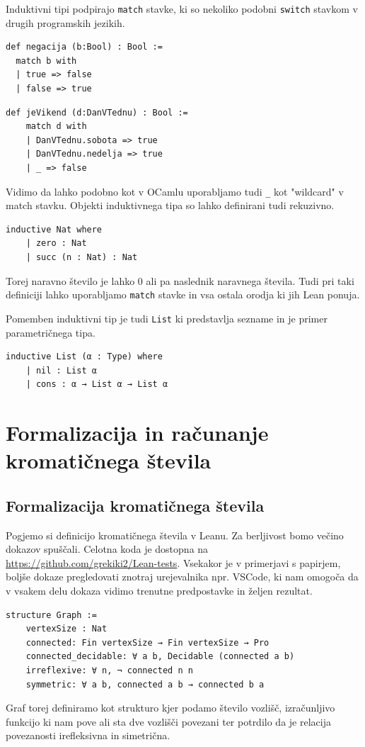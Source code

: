 \documentclass[mat1]{fmfdelo}
\begin{document}
Induktivni tipi podpirajo \lstinline{match} stavke, ki so nekoliko podobni \lstinline{switch} stavkom v drugih programskih jezikih.

\begin{lstlisting}
def negacija (b:Bool) : Bool :=
  match b with
  | true => false
  | false => true
\end{lstlisting}

\begin{lstlisting}
def jeVikend (d:DanVTednu) : Bool :=
    match d with
    | DanVTednu.sobota => true
    | DanVTednu.nedelja => true
    | _ => false
\end{lstlisting}

Vidimo da lahko podobno kot v OCamlu uporabljamo tudi \lstinline{_} kot "wildcard" v match stavku.
Objekti induktivnega tipa so lahko definirani tudi rekuzivno.
\begin{lstlisting}
inductive Nat where
    | zero : Nat
    | succ (n : Nat) : Nat
\end{lstlisting}
Torej naravno število je lahko 0 ali pa naslednik naravnega števila. Tudi pri taki definiciji lahko uporabljamo \lstinline{match} stavke
in vsa ostala orodja ki jih Lean ponuja.

Pomemben induktivni tip je tudi \lstinline{List} ki predstavlja sezname in je primer parametričnega tipa.
\begin{lstlisting}
inductive List (α : Type) where
    | nil : List α
    | cons : α → List α → List α
\end{lstlisting}


\section{Formalizacija in računanje kromatičnega števila}
\subsection{Formalizacija kromatičnega števila}
Pogjemo si definicijo kromatičnega števila v Leanu.
Za berljivost bomo večino dokazov spuščali.
Celotna koda je dostopna na \url{https://github.com/grekiki2/Lean-tests}.
Vsekakor je v primerjavi s papirjem, boljše dokaze pregledovati znotraj urejevalnika npr. VSCode, ki nam omogoča da v vsakem delu dokaza vidimo 
trenutne predpostavke in željen rezultat. 

\begin{lstlisting}
structure Graph :=
    vertexSize : Nat
    connected: Fin vertexSize → Fin vertexSize → Pro
    connected_decidable: ∀ a b, Decidable (connected a b)
    irreflexive: ∀ n, ¬ connected n n
    symmetric: ∀ a b, connected a b → connected b a
\end{lstlisting}
Graf torej definiramo kot strukturo kjer podamo število vozlišč, izračunljivo funkcijo ki nam pove
ali sta dve vozlišči povezani ter potrdilo da je relacija povezanosti irefleksivna in simetrična.
\end{document}
